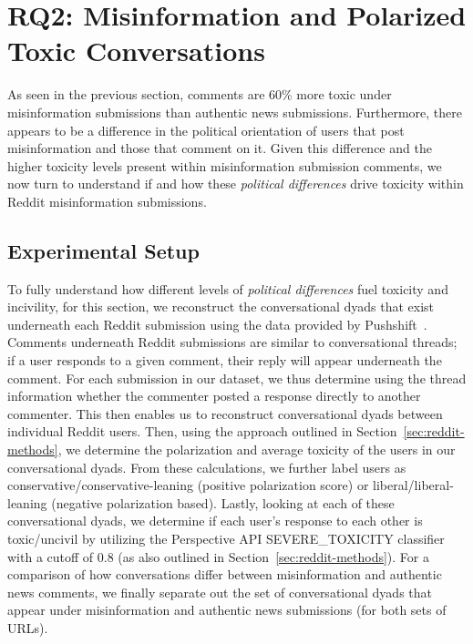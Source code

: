 \section{RQ2: Misinformation and Polarized Toxic Conversations}\label{sec:toxic-polarized-subreddits}
As seen in the previous section, comments are 60\% more toxic under misinformation submissions than authentic news submissions. Furthermore, there appears to be a difference in the political orientation of users that post misinformation and those that comment on it.  Given this difference and the higher toxicity levels present within misinformation submission comments, we now turn to understand if and how these \textit {political differences} drive toxicity within Reddit misinformation submissions. 

\subsection{Experimental Setup}
To fully understand how different levels of \textit{political differences} fuel toxicity and incivility, for this section, we reconstruct the conversational dyads that exist underneath each Reddit submission using the data provided by Pushshift~\cite{baumgartner2020pushshift}. Comments underneath Reddit submissions are similar to conversational threads; if a user responds to a given comment, their reply will appear underneath the comment. For each submission in our dataset, we thus determine using the thread information whether the commenter posted a response directly to another commenter. This then enables us to reconstruct conversational dyads between individual Reddit users. Then, using the approach outlined in Section~\ref{sec:reddit-methods}, we determine the polarization and average toxicity of the users in our conversational dyads. From these calculations, we further label users as conservative/conservative-leaning (positive polarization score) or liberal/liberal-leaning (negative polarization based). Lastly, looking at each of these conversational dyads, we determine if each user's response to each other is toxic/uncivil by utilizing the Perspective API SEVERE\_TOXICITY classifier with a cutoff of 0.8 (as also outlined in Section~\ref{sec:reddit-methods}). For a comparison of how conversations differ between misinformation and authentic news comments, we finally separate out the set of conversational dyads that appear under misinformation and authentic news submissions (for both sets of URLs). 
